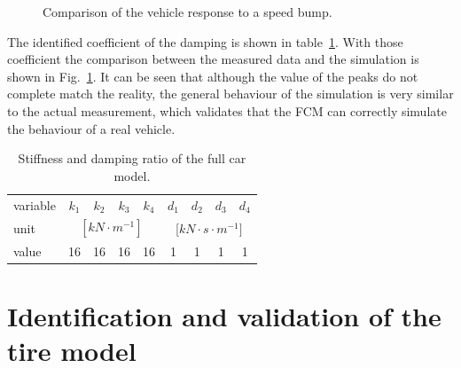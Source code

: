 \begin{figure}
 \label{fig:validation_bump}
 \caption{Comparison of the vehicle response to a speed bump.}
 \end{figure}
 

The identified coefficient of the damping is shown in table~\ref{tbl:damping}.
%
With those coefficient the comparison between the measured data and the simulation is shown in Fig.~\ref{fig:validation_bump}.
% 
It can be seen that although the value of the peaks do not complete match the reality, the general behaviour of the simulation is very similar to the actual measurement, which validates that the \ac{FCM} can correctly simulate the behaviour of a real vehicle.

\begin{table}
\centering
\caption{Stiffness and damping ratio of the full car model.}
\label{tbl:damping}
\begin{tabular}{lcccccccc}
\hline
variable & $k_1$ & $k_2$ & $k_3$ & $k_4$ & $d_1$ & $d_2$ & $d_3$ & $d_4$ \\
unit & \multicolumn{4}{c}{$[kN\cdot m^{-1}]$} & \multicolumn{4}{c}{[$kN\cdot s \cdot m^{-1}]$} \\
value & 16 & 16 & 16 & 16 & 1 & 1 & 1 & 1 \\ \hline
\end{tabular}
\end{table}
 
 
 
 
 
 
 \section{Identification and validation of the tire model}
 
